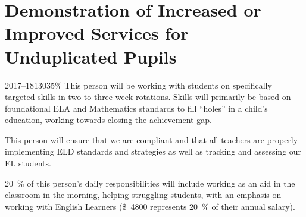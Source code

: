 \documentclass{article}
\newcommand{\dollar}[1]{\SI{#1}[\$]{}}
\begin{document}
\section{Demonstration of Increased or Improved Services for Unduplicated Pupils}
\begin{demIISUP}{2017--18}{13035}{\si{\percent}}
 This person will be working with students on specifically targeted skills in two to three week rotations. Skills will primarily be based on foundational ELA and Mathematics standards to fill ``holes'' in a child's education, working towards closing the achievement gap.

 This person will ensure that we are compliant and that all teachers are properly implementing ELD standards and strategies as well as tracking and assessing our EL students.

 \SI{20}{\percent} of this person's daily responsibilities will include working as an aid in the classroom in the morning, helping struggling students, with an emphasis on working with English Learners (\dollar{4800} represents \SI{20}{\percent} of their annual salary).
\end{demIISUP}
\end{document}

